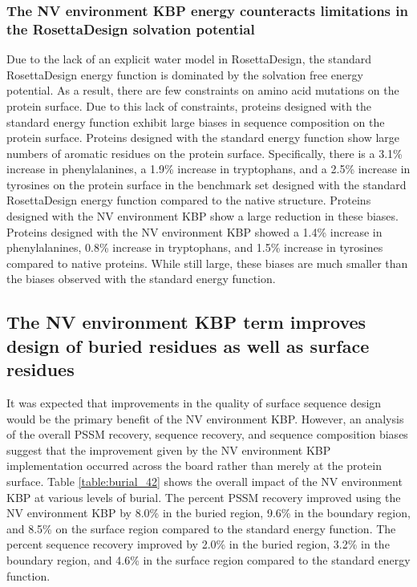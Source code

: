 \subsubsection{The \acs{NV} environment \acs{KBP} energy counteracts limitations in the RosettaDesign solvation potential}
Due to the lack of an explicit water model in RosettaDesign, the standard RosettaDesign energy function is dominated by the solvation free energy potential.
As a result, there are few constraints on amino acid mutations on the protein surface.
Due to this lack of constraints, proteins designed with the standard energy function exhibit large biases in sequence composition on the protein surface.
Proteins designed with the standard energy function show large numbers of aromatic residues on the protein surface.
Specifically, there is a 3.1\% increase in phenylalanines, a 1.9\% increase in tryptophans, and a 2.5\% increase in tyrosines on the protein surface in the benchmark set designed with the standard RosettaDesign energy function compared to the native structure.
Proteins designed with the \ac{NV} environment \ac{KBP} show a large reduction in these biases.
Proteins designed with the \ac{NV} environment \ac{KBP} showed a 1.4\% increase in phenylalanines, 0.8\% increase in tryptophans, and 1.5\% increase in tyrosines compared to native proteins.
While still large, these biases are much smaller than the biases observed with the standard energy function. 

\subsection{The \acs{NV} environment \acs{KBP} term improves design of buried residues as well as surface residues}
It was expected that improvements in the quality of surface sequence design would be the primary benefit of the \ac{NV} environment \ac{KBP}.
However, an analysis of the overall \ac{PSSM} recovery, sequence recovery, and sequence composition biases suggest that the improvement given by the \ac{NV} environment \ac{KBP} implementation occurred across the board rather than merely at the protein surface.
Table \ref{table:burial_42} shows the overall impact of the \ac{NV} environment \ac{KBP} at various levels of burial.
The percent \ac{PSSM} recovery improved using the \ac{NV} environment \ac{KBP} by 8.0\% in the buried region, 9.6\% in the boundary region, and 8.5\% on the surface region compared to the standard energy function.
The percent sequence recovery improved by 2.0\% in the buried region, 3.2\% in the boundary region, and 4.6\% in the surface region compared to the standard energy function.
 
